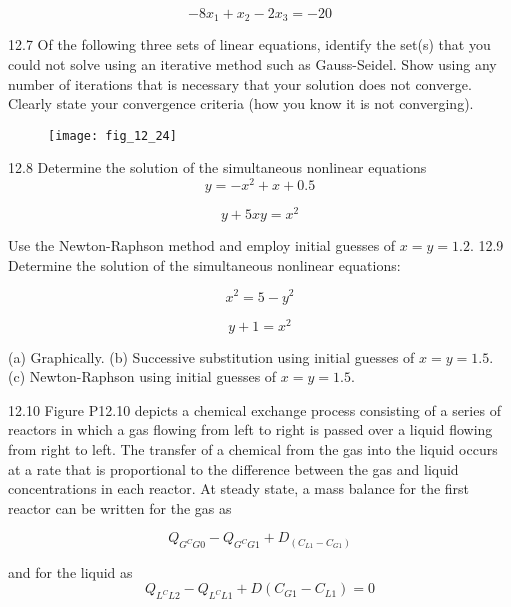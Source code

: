 \documentclass[../main.tex]{subfiles}
\begin{document}
\begin{equation}
-8x_{1}+x_{2}-2x_{3}=-20
\end{equation}

12.7 Of the following three sets of linear equations, identify
the set(s) that you could not solve using an iterative method
such as Gauss-Seidel. Show using any number of iterations
that is necessary that your solution does not converge.
Clearly state your convergence criteria (how you know it is
not converging).

\begin{figure}[H]
		\centering
		\texttt{[image: fig\_12\_24]}
	   \label{fig:fig_12_24}
\end{figure}

12.8 Determine the solution of the simultaneous nonlinear
equations
\begin{equation}
y=-x^{2}+x+0.5
\end{equation}

\begin{equation}
y+5xy=x^{2}
\end{equation}

Use the Newton-Raphson method and employ initial guesses
of $x=y=1.2$.
12.9 Determine the solution of the simultaneous nonlinear
equations:

\begin{equation}
x^{2}=5-y^{2}
\end{equation}

\begin{equation}
y+1=x^{2}
\end{equation}

(a) Graphically.
(b) Successive substitution using initial guesses of $x=y=1.5$.
(c) Newton-Raphson using initial guesses of $x=y=1.5$.

12.10 Figure P12.10 depicts a chemical exchange process
consisting of a series of reactors in which a gas flowing
from left to right is passed over a liquid flowing from right
to left. The transfer of a chemical from the gas into the
liquid occurs at a rate that is proportional to the difference
between the gas and liquid concentrations in each reactor.
At steady state, a mass balance for the first reactor can be
written for the gas as

\begin{equation}
Q_{G^{C}G0}-Q_{G^{C}G1}+D_{(C_{L1}-C_{G1})}
\end{equation}

and for the liquid as
\begin{equation}
Q_{L^{C}L2}-Q_{L^{C}L1}+D(C_{G1}-C_{L1})=0
\end{equation}
\end{document}
